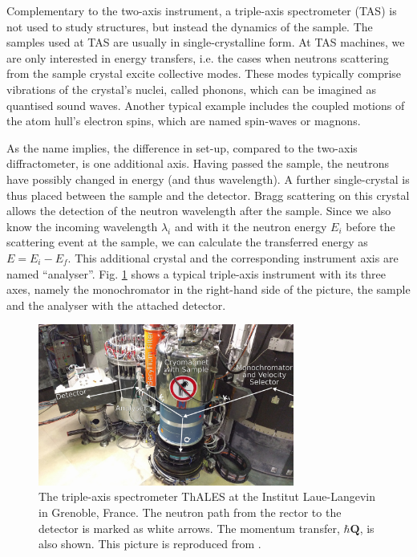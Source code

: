 Complementary to the two-axis instrument, a triple-axis spectrometer (TAS) is not used to study structures, but instead the dynamics of the sample. The samples used at TAS are usually in single-crystalline form. At TAS machines, we are only interested in energy transfers, i.e. the cases when neutrons scattering from the sample crystal excite collective modes. These modes typically comprise vibrations of the crystal's nuclei, called phonons, which can be imagined as quantised sound waves. Another typical example includes the coupled motions of the atom hull's electron spins, which are named spin-waves or magnons.

As the name implies, the difference in set-up, compared to the two-axis diffractometer, is one additional axis. Having passed the sample, the neutrons have possibly changed in energy (and thus wavelength). A further single-crystal is thus placed between the sample and the detector. Bragg scattering on this crystal allows the detection of the neutron wavelength after the sample. Since we also know the incoming wavelength $\lambda_i$ and with it the neutron energy $E_i$ before the scattering event at the sample, we can calculate the transferred energy as $E = E_i - E_f$. This additional crystal and the corresponding instrument axis are named ``analyser''. Fig. \ref{fig:thales} shows a typical triple-axis instrument with its three axes, namely the monochromator in the right-hand side of the picture, the sample and the analyser with the attached detector.

\begin{figure}[htb]
	\centering
	\includegraphics[width=0.75\textwidth]{figures/thales.jpg}
	\caption{The triple-axis spectrometer ThALES \cite{thales} at the Institut Laue-Langevin in Grenoble, France. The neutron path from the rector to the detector is marked as white arrows. The momentum transfer, $\hbar \bm{Q}$, is also shown. This picture is reproduced from \cite{skxpaper}.}
	\label{fig:thales}
\end{figure}



